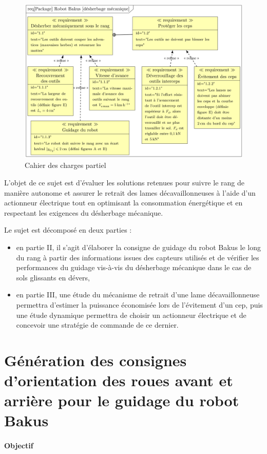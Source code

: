 \begin{figure}[!h]
\centering\includegraphics[width=0.8\linewidth]{img/fig03}
 \caption{Cahier des charges partiel}
 \label{img03}
\end{figure}

L'objet de ce sujet est d'évaluer les solutions retenues pour suivre le rang de manière autonome et assurer le retrait des lames décavaillonneuses à l'aide d'un actionneur électrique tout en optimisant la consommation énergétique et en respectant les exigences du désherbage mécanique.

Le sujet est décomposé en deux parties :
\begin{itemize}
\item en partie II, il s'agit d'élaborer la consigne de guidage du robot Bakus le long du rang à partir des informations issues des capteurs utilisés et de vérifier les performances du guidage vis-à-vis du désherbage mécanique dans le cas de sols glissants en dévers,
 \item en partie III, une étude du mécanisme de retrait d'une lame décavaillonneuse permettra d'estimer la puissance économisée lors de l'évitement d'un cep, puis une étude dynamique permettra de choisir un actionneur électrique et de concevoir une stratégie de commande de ce dernier.
\end{itemize}

\section{Génération des consignes d'orientation des roues avant et arrière
pour le guidage du robot Bakus}

\paragraph{Objectif}

